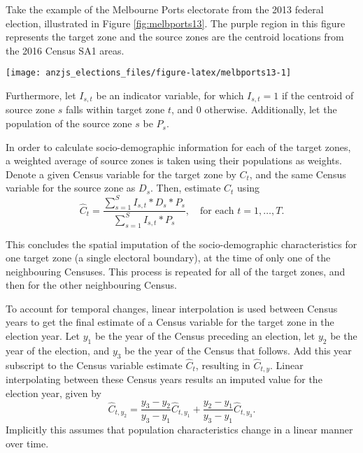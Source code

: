 \documentclass[times, doublespace]{anzsauth}
\let\origfigure\figure
\let\endorigfigure\endfigure
\renewenvironment{figure}[1][2] {
    \expandafter\origfigure\expandafter[htbp]
} {
    \endorigfigure
}
\begin{document}
Take the example of the Melbourne Ports electorate from the 2013 federal election, illustrated in Figure \ref{fig:melbports13}. The purple region in this figure represents the target zone and the source zones are the centroid locations from the 2016 Census SA1 areas.

\begin{figure}[h]

{\centering \texttt{[image: anzjs\_elections\_files/figure-latex/melbports13-1]} 

}

\caption{The electoral boundaries for Melbourne Ports (shown in purple) and surrounding electorates, with centroids for Statistical Area 1 regions from the 2016 Census overlaid. The centroids falling within the purple region are attributed to Melbourne Ports.}\label{fig:melbports13}
\end{figure}

Furthermore, let \(I_{s,t}\) be an indicator variable, for which \(I_{s,t} = 1\) if the centroid of source zone \(s\) falls within target zone \(t\), and \(0\) otherwise. Additionally, let the population of the source zone \(s\) be \(P_{s}\).

In order to calculate socio-demographic information for each of the target zones, a weighted average of source zones is taken using their populations as weights. Denote a given Census variable for the target zone by \(C_t\), and the same Census variable for the source zone as \(D_s\). Then, estimate \(C_t\) using
\[
  \hat{C}_t = \frac{\sum_{s=1}^{S}{I_{s,t}*D_s*P_s}}%
  {\sum_{s=1}^{S}{I_{s,t}*P_s}},
  \quad\text{for each $t=1,\dots,T$}.
\]

This concludes the spatial imputation of the socio-demographic characteristics for one target zone (a single electoral boundary), at the time of only one of the neighbouring Censuses. This process is repeated for all of the target zones, and then for the other neighbouring Census.

\enlargethispage*{0.5cm}

To account for temporal changes, linear interpolation is used between Census years to get the final estimate of a Census variable for the target zone in the election year. Let \(y_1\) be the year of the Census preceding an election, let \(y_2\) be the year of the election, and \(y_3\) be the year of the Census that follows. Add this year subscript to the Census variable estimate \(\hat{C}_t\), resulting in \(\hat{C}_{t,y}\). Linear interpolating between these Census years results an imputed value for the election year, given by
\[
  \hat{C}_{t,y_2} = \frac{y_3-y_2}{y_3-y_1} \hat{C}_{t,y_1} +
    \frac{y_2-y_1}{y_3-y_1} \hat{C}_{t,y_3}.
\]
Implicitly this assumes that population characteristics change in a linear manner over time.
\end{document}
